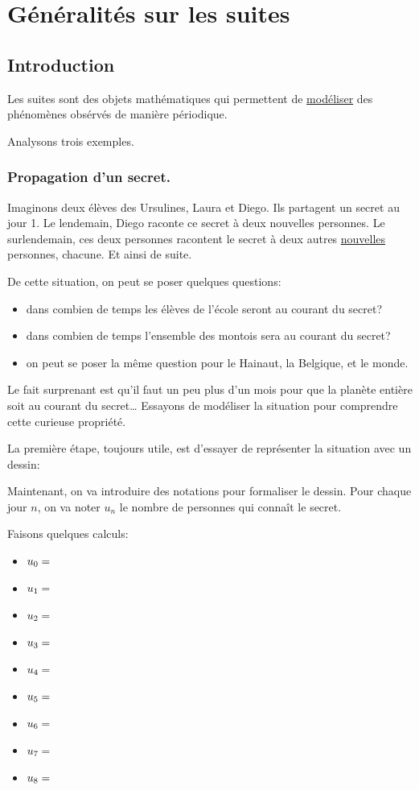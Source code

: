 \documentclass[a4paper,12pt]{report}
\begin{document}
\chapter{Généralités sur les suites}
\label{sec:orgaac1e7a}
\section{Introduction}
\label{sec:orgc9523d1}
Les suites sont des objets mathématiques qui permettent de \uline{modéliser} des
phénomènes obsérvés de manière périodique.

Analysons trois exemples.

\subsection{Propagation d'un secret.}
\label{sec:org65c75f1}

Imaginons deux élèves des Ursulines, Laura et Diego. Ils partagent un secret au
jour 1. Le lendemain, Diego raconte ce secret à deux nouvelles personnes. Le
surlendemain, ces deux personnes racontent le secret à deux autres \uline{nouvelles}
personnes, chacune. Et ainsi de suite.

De cette situation, on peut se poser quelques questions:
\begin{itemize}
\item dans combien de temps les élèves de l'école seront au courant du secret?
\item dans combien de temps l'ensemble des montois sera au courant du secret?
\item on peut se poser la même question pour le Hainaut, la Belgique, et le monde.
\end{itemize}

Le fait surprenant est qu'il faut un peu plus d'un mois pour que la planète
entière soit au courant du secret\ldots{} Essayons de modéliser la situation pour
comprendre cette curieuse propriété.

La première étape, toujours utile, est d'essayer de représenter la situation
avec un dessin:

\vspace{10cm}

Maintenant, on va introduire des notations pour formaliser le dessin. Pour
chaque jour \(n\), on va noter \(u_n\) le nombre de personnes qui connaît le
secret.

Faisons quelques calculs:
\begin{itemize}
\item \(u_0=\dotfill\)
\item \(u_{1}=\dotfill\)
\item \(u_{2}=\dotfill\)
\item \(u_{3}=\dotfill\)
\item \(u_{4}=\dotfill\)
\item \(u_{5}=\dotfill\)
\item \(u_{6}=\dotfill\)
\item \(u_{7}=\dotfill\)
\item \(u_{8}=\dotfill\)
\end{itemize}
\end{document}
